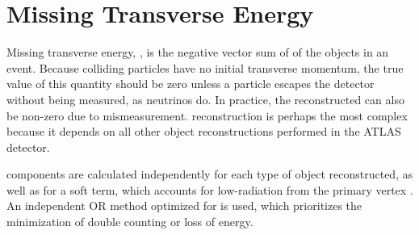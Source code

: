 \section{Missing Transverse Energy}
\label{sec:reco_met}

Missing transverse energy, \met, is the negative vector sum of \pt of the objects in an event. Because colliding particles have no initial transverse momentum, the true value of this quantity should be zero unless a particle escapes the detector without being measured, as neutrinos do. In practice, the reconstructed \met can also be non-zero due to mismeasurement. \met reconstruction is perhaps the most complex because it depends on all other object reconstructions performed in the ATLAS detector. 

\met components are calculated independently for each type of object reconstructed, as well as for a soft term, which accounts for low-\pt radiation from the primary vertex \cite{ATL-PHYS-PUB-2015-027}. An independent \ac{OR} method optimized for \met is used, which prioritizes the minimization of double counting or loss of energy. 



